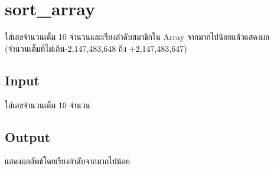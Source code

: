 \documentclass{article}
\begin{document}
\section*{sort_array}

{ใส่เลขจำนวนเต็ม 10 จำนวนและ}เรียงลำดับสมาชิกใน Array จากมากไปน้อยแล้วแสดงผล\\



{(จำนวนเต็มที่ไม่เกิน-2,147,483,648 ถึง +2,147,483,647)}



\subsection*{Input}
ใส่เลขจำนวนเต็ม 10 จำนวน



\subsection*{Output}
แสดงผลลัพธ์โดยเรียงลำดับจากมากไปน้อย
\end{document}

